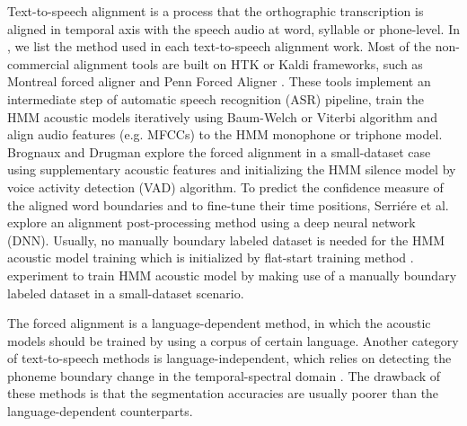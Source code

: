 Text-to-speech alignment is a process that the orthographic transcription is aligned in temporal axis with the speech audio at word, syllable or phone-level. In , we list the method used in each text-to-speech alignment work. Most of the non-commercial alignment tools are built on HTK  or Kaldi  frameworks, such as Montreal forced aligner  and Penn Forced Aligner . These tools implement an intermediate step of automatic speech recognition (ASR) pipeline, train the HMM acoustic models iteratively using Baum-Welch or Viterbi algorithm and align audio features (e.g. MFCCs) to the HMM monophone or triphone model. Brognaux and Drugman  explore the forced alignment in a small-dataset case using supplementary acoustic features and initializing the HMM silence model by voice activity detection (VAD) algorithm. To predict the confidence measure of the aligned word boundaries and to fine-tune their time positions, Serri\'{e}re et al.  explore an alignment post-processing method using a deep neural network (DNN). Usually, no manually boundary labeled dataset is needed for the HMM acoustic model training which is initialized by flat-start training method .  experiment to train HMM acoustic model by making use of a manually boundary labeled dataset in a small-dataset scenario.

The forced alignment is a language-dependent method, in which the acoustic models should be trained by using a corpus of certain language. Another category of text-to-speech methods is language-independent, which relies on detecting the phoneme boundary change in the temporal-spectral domain . The drawback of these methods is that the segmentation accuracies are usually poorer than the language-dependent counterparts. 

